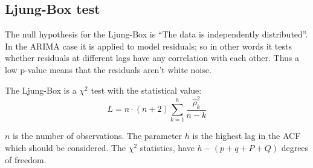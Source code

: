\subsection{Ljung-Box test}

The null hypothesis for the Ljung-Box is ``The data is independently distributed''.
In the ARIMA case it is applied to model residuals; so in other words it tests whether residuals at different lags have any correlation with each other. 
 Thus a low p-value means that the residuals aren't white noise.

The Ljung-Box is a $\chi^2$ test with the statistical value:
\begin{equation}
L = n \cdot (n + 2) \sum_{k=1}^h \frac{\hat{\rho}_k^2}{n - k}
\end{equation}

$n$ is the number of observations. The parameter $h$ is the highest lag in the ACF which should be considered. The $\chi^2$ statistics, have $h - (p + q + P + Q)$ degrees of freedom.
